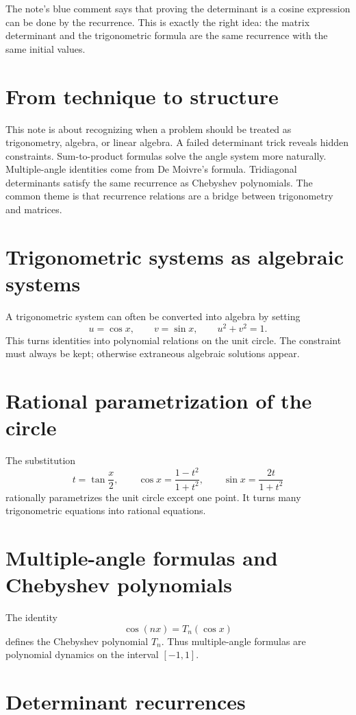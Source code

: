 The note's blue comment says that proving the determinant is a cosine expression can be done by the recurrence.  This is exactly the right idea: the matrix determinant and the trigonometric formula are the same recurrence with the same initial values.

\section{From technique to structure}

This note is about recognizing when a problem should be treated as trigonometry, algebra, or linear algebra.  A failed determinant trick reveals hidden constraints.  Sum-to-product formulas solve the angle system more naturally.  Multiple-angle identities come from De Moivre's formula.  Tridiagonal determinants satisfy the same recurrence as Chebyshev polynomials.  The common theme is that recurrence relations are a bridge between trigonometry and matrices.

\section{Trigonometric systems as algebraic systems}

A trigonometric system can often be converted into algebra by setting
\[
  u=\cos x,\qquad v=\sin x,\qquad u^2+v^2=1.
\]
This turns identities into polynomial relations on the unit circle.  The constraint must always be kept; otherwise extraneous algebraic solutions appear.

\section{Rational parametrization of the circle}

The substitution
\[
  t=\tan\frac x2,\qquad \cos x=\frac{1-t^2}{1+t^2},\qquad \sin x=\frac{2t}{1+t^2}
\]
rationally parametrizes the unit circle except one point.  It turns many trigonometric equations into rational equations.

\section{Multiple-angle formulas and Chebyshev polynomials}

The identity
\[
  \cos(nx)=T_n(\cos x)
\]
defines the Chebyshev polynomial \(T_n\).  Thus multiple-angle formulas are polynomial dynamics on the interval \([-1,1]\).

\section{Determinant recurrences}

